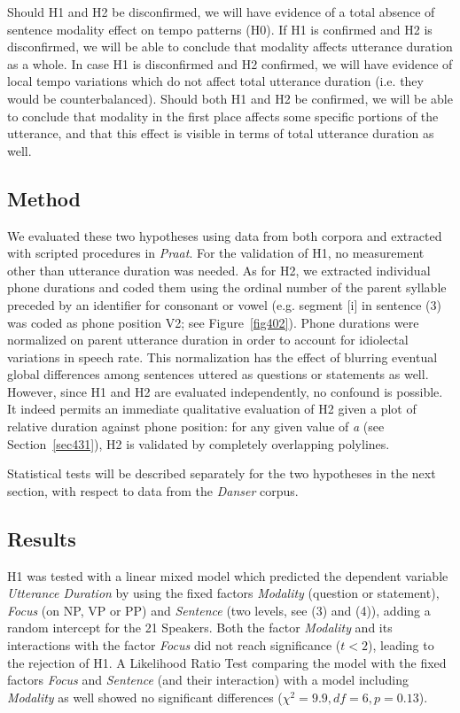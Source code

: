 Should H1 and H2 be disconfirmed, we will have evidence of a total absence of sentence modality effect on tempo patterns (H0). If H1 is confirmed and H2 is disconfirmed, we will be able to conclude that modality affects utterance duration as a whole. In case H1 is disconfirmed and H2 confirmed, we will have evidence of local tempo variations which do not affect total utterance duration (i.e. they would be counterbalanced). Should both H1 and H2 be confirmed, we will be able to conclude that modality in the first place affects some specific portions of the utterance, and that this effect is visible in terms of total utterance duration as well. 

\subsection{Method}\label{sec432}
We evaluated these two hypotheses using data from both corpora and extracted with scripted procedures in \textit{Praat}. For the validation of H1, no measurement other than utterance duration was needed. As for H2, we extracted individual phone durations and coded them using the ordinal number of the parent syllable preceded by an identifier for consonant or vowel (e.g. segment [i] in sentence (3) was coded as phone position V2; see  Figure~\ref{fig402}). Phone durations were normalized on parent utterance duration in order to account for idiolectal variations in speech rate. This normalization has the effect of blurring eventual global differences among sentences uttered as questions or statements as well. However, since H1 and H2 are evaluated independently, no confound is possible. It indeed permits an immediate qualitative evaluation of H2 given a plot of relative duration against phone position: for any given value of \textit{a} (see Section~\ref{sec431}), H2 is validated by completely overlapping polylines. 

Statistical tests will be described separately for the two hypotheses in the next section, with respect to data from the \textit{Danser} corpus.

\subsection{Results}\label{sec433}

H1 was tested with a linear mixed model which predicted the dependent variable \textit{Utterance Duration} by using the fixed factors \textit{Modality} (question or statement), \textit{Focus} (on NP, VP or PP) and \textit{Sentence} (two levels, see (3) and (4)), adding a random intercept for the 21 Speakers. Both the factor \textit{Modality} and its interactions with the factor \textit{Focus} did not reach significance ($t<2$), leading to the rejection of H1. A Likelihood Ratio Test comparing the model with the fixed factors \textit{Focus} and \textit{Sentence} (and their interaction) with a model including \textit{Modality} as well showed no significant differences ($\chi^{2}=9.9, df=6, p=0.13$). 

